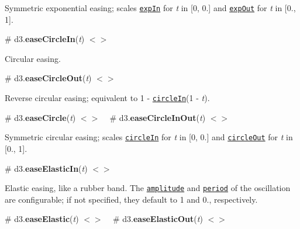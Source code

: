 Symmetric exponential easing; scales \href{#easeExpIn}{\tt exp\+In} for {\itshape t} in \mbox{[}0, 0.\mbox{]} and \href{#easeExpOut}{\tt exp\+Out} for {\itshape t} in \mbox{[}0., 1\mbox{]}.

\href{http://bl.ocks.org/mbostock/248bac3b8e354a9103c4/#expInOut}{\tt }

\label{_easeCircleIn}%
\# d3.{\bfseries ease\+Circle\+In}({\itshape t}) \href{https://github.com/d3/d3-ease/blob/master/src/circle.js#L1}{\tt $<$$>$}

Circular easing.

\href{http://bl.ocks.org/mbostock/248bac3b8e354a9103c4/#circleIn}{\tt }

\label{_easeCircleOut}%
\# d3.{\bfseries ease\+Circle\+Out}({\itshape t}) \href{https://github.com/d3/d3-ease/blob/master/src/circle.js#L5}{\tt $<$$>$}

Reverse circular easing; equivalent to 1 -\/ \href{#easeCircleIn}{\tt circle\+In}(1 -\/ {\itshape t}).

\href{http://bl.ocks.org/mbostock/248bac3b8e354a9103c4/#circleOut}{\tt }

\label{_easeCircle}%
\# d3.{\bfseries ease\+Circle}({\itshape t}) \href{https://github.com/d3/d3-ease/blob/master/src/circle.js}{\tt $<$$>$} ~\newline
\label{_easeCircleInOut}%
\# d3.{\bfseries ease\+Circle\+In\+Out}({\itshape t}) \href{https://github.com/d3/d3-ease/blob/master/src/circle.js#L9}{\tt $<$$>$}

Symmetric circular easing; scales \href{#easeCircleIn}{\tt circle\+In} for {\itshape t} in \mbox{[}0, 0.\mbox{]} and \href{#easeCircleOut}{\tt circle\+Out} for {\itshape t} in \mbox{[}0., 1\mbox{]}.

\href{http://bl.ocks.org/mbostock/248bac3b8e354a9103c4/#circleInOut}{\tt }

\label{_easeElasticIn}%
\# d3.{\bfseries ease\+Elastic\+In}({\itshape t}) \href{https://github.com/d3/d3-ease/blob/master/src/elastic.js#L5}{\tt $<$$>$}

Elastic easing, like a rubber band. The \href{#elastic_amplitude}{\tt amplitude} and \href{#elastic_period}{\tt period} of the oscillation are configurable; if not specified, they default to 1 and 0., respectively.

\href{http://bl.ocks.org/mbostock/248bac3b8e354a9103c4/#elasticIn}{\tt }

\label{_easeElastic}%
\# d3.{\bfseries ease\+Elastic}({\itshape t}) \href{https://github.com/d3/d3-ease/blob/master/src/elastic.js}{\tt $<$$>$} ~\newline
\label{_easeElasticOut}%
\# d3.{\bfseries ease\+Elastic\+Out}({\itshape t}) \href{https://github.com/d3/d3-ease/blob/master/src/elastic.js#L18}{\tt $<$$>$}

